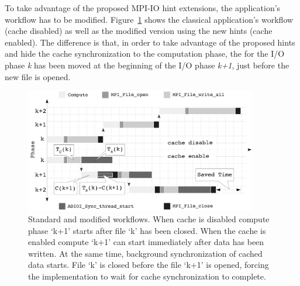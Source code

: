 To take advantage of the proposed MPI-IO hint extensions, the application's workflow has to be modified. Figure~\ref{figure: workflow} shows the classical application's workflow (cache disabled) as well as the modified 
version using the new hints (cache enabled). The difference is that, in order to take advantage of the proposed hints and hide the cache synchronization to the computation phase, the  for the 
I/O phase \textit{k} has been moved at the beginning of the I/O phase \textit{k+1}, just before the new file is opened.

\begin{figure}[!htb]
  \centering
  \includegraphics[width=0.9\textwidth]{figures/workflow_baw}
  \caption{Standard and modified workflows. When cache is disabled compute phase `k+1' starts after file `k' has been closed. 
  When the cache is enabled compute `k+1' can start immediately after data has been written. At the same time, background 
  synchronization of cached data starts. File `k' is closed before the file `k+1' is opened, forcing the implementation to wait 
  for cache synchronization to complete.}
  \label{figure: workflow}
\end{figure}

